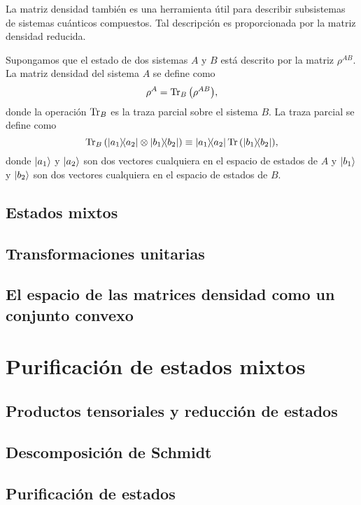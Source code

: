 \documentclass[12pt]{report}
\begin{document}
La matriz densidad también es una herramienta útil para describir subsistemas de sistemas cuánticos compuestos.
Tal descripción es proporcionada por la matriz densidad reducida. 

Supongamos que el estado de dos sistemas $A$ y $B$ está descrito por la matriz $\rho ^{AB}$. La matriz densidad del
sistema $A$ se define como
\begin{equation}
\rho ^A=\Tr _B\qty(\rho ^{AB}),
\label{eq:reduced_DM}
\end{equation}
donde la operación $\Tr _B$ es la traza parcial sobre el sistema $B$. La traza parcial se define como
\begin{equation}
\Tr _B\qty(\dyad{a_1}{a_2}\otimes \dyad{b_1}{b_2}) \equiv \dyad{a_1}{a_2}\Tr \qty(\dyad{b_1}{b_2}),
\end{equation}
donde $\ket{a_1}$ y $\ket{a_2}$ son dos vectores cualquiera en el espacio de estados de $A$ y $\ket{b_1}$ y $\ket{b_2}$
son dos vectores cualquiera en el espacio de estados de $B$. 


\section{Estados mixtos}

\section{Transformaciones unitarias}

\section{El espacio de las matrices densidad como un conjunto convexo}



\chapter{Purificación de estados mixtos}

\section{Productos tensoriales y reducción de estados}

\section{Descomposición de Schmidt}

\section{Purificación de estados}
\end{document}
